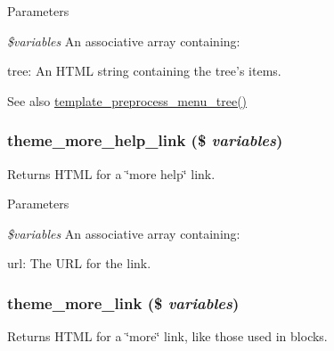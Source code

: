 \begin{DoxyParams}{Parameters}
\item[{\em \$variables}]An associative array containing:
\begin{DoxyItemize}
\item tree: An HTML string containing the tree's items.
\end{DoxyItemize}\end{DoxyParams}
\begin{DoxySeeAlso}{See also}
\hyperlink{group__menu_ga3b3b2907371200b81f18bfaed7538855}{template\_\-preprocess\_\-menu\_\-tree()} 
\end{DoxySeeAlso}
\hypertarget{group__themeable_ga59ab4d425ab4c43d94c26538fbe3e9aa}{
\subsubsection[{theme\_\-more\_\-help\_\-link}]{\setlength{\rightskip}{0pt plus 5cm}theme\_\-more\_\-help\_\-link (\$ {\em variables})}}
\label{group__themeable_ga59ab4d425ab4c43d94c26538fbe3e9aa}
Returns HTML for a \char`\"{}more help\char`\"{} link.


\begin{DoxyParams}{Parameters}
\item[{\em \$variables}]An associative array containing:
\begin{DoxyItemize}
\item url: The URL for the link. 
\end{DoxyItemize}\end{DoxyParams}
\hypertarget{group__themeable_ga1f35c4f1e512ae423df22c7a33edf043}{
\subsubsection[{theme\_\-more\_\-link}]{\setlength{\rightskip}{0pt plus 5cm}theme\_\-more\_\-link (\$ {\em variables})}}
\label{group__themeable_ga1f35c4f1e512ae423df22c7a33edf043}
Returns HTML for a \char`\"{}more\char`\"{} link, like those used in blocks.


